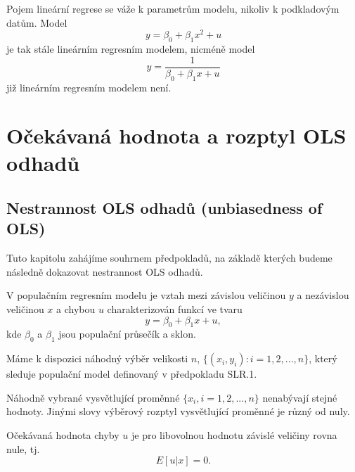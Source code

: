 Pojem lineární regrese se váže k parametrům modelu, nikoliv k podkladovým datům. Model
\begin{equation}
y = \beta_0 + \beta_1 x^2 + u
\end{equation}
je tak stále lineárním regresním modelem, nicméně model
\begin{equation}
y = \frac{1}{\beta_0 + \beta_1 x + u}
\end{equation}
již lineárním regresním modelem není.

\section{Očekávaná hodnota a rozptyl OLS odhadů}

\subsection{Nestrannost OLS odhadů (unbiasedness of OLS)}

Tuto kapitolu zahájíme souhrnem předpokladů, na základě kterých budeme následně dokazovat nestrannost OLS odhadů.

\begin{assumption}
V populačním regresním modelu je vztah mezi závislou veličinou $y$ a nezávislou veličinou $x$ a chybou $u$ charakterizován funkcí ve tvaru
\begin{equation}
y = \beta_0 + \beta_1 x + u,
\end{equation}
kde $\beta_0$ a $\beta_1$ jsou populační průsečík a sklon.

\raggedleft{$\clubsuit$}
\end{assumption}

\begin{assumption}
Máme k dispozici náhodný výběr velikosti $n$, $\{(x_i, y_i): i = 1, 2, ..., n \}$, který sleduje populační model definovaný v předpokladu SLR.1.

\raggedleft{$\clubsuit$}
\end{assumption}

\begin{assumption}
Náhodně vybrané vysvětlující proměnné $\{x_i, i = 1, 2, ..., n\}$ nenabývají stejné hodnoty. Jinými slovy 
výběrový rozptyl vysvětlující proměnné je různý od nuly.

\raggedleft{$\clubsuit$}
\end{assumption}

\begin{assumption}
Očekávaná hodnota chyby $u$ je pro libovolnou hodnotu závislé veličiny rovna nule, tj.
\begin{equation}
E[u|x] = 0.
\end{equation}

\raggedleft{$\clubsuit$}
\end{assumption}

